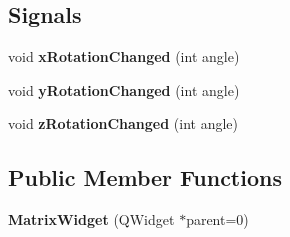 \subsection*{Signals}
\begin{DoxyCompactItemize}
\item 
\hypertarget{class_matrix_widget_a8ca3c8b5f4bee3639e3796888467bd4e}{void {\bfseries x\+Rotation\+Changed} (int angle)}\label{class_matrix_widget_a8ca3c8b5f4bee3639e3796888467bd4e}

\item 
\hypertarget{class_matrix_widget_a6ccdf79103c98aaebb433ea80640533b}{void {\bfseries y\+Rotation\+Changed} (int angle)}\label{class_matrix_widget_a6ccdf79103c98aaebb433ea80640533b}

\item 
\hypertarget{class_matrix_widget_a10801025feb3fa29eed36d30c0de1d6e}{void {\bfseries z\+Rotation\+Changed} (int angle)}\label{class_matrix_widget_a10801025feb3fa29eed36d30c0de1d6e}

\end{DoxyCompactItemize}
\subsection*{Public Member Functions}
\begin{DoxyCompactItemize}
\item 
\hypertarget{class_matrix_widget_a9ff859d14c9b69480e4d57ebd51905e8}{{\bfseries Matrix\+Widget} (Q\+Widget $\ast$parent=0)}\label{class_matrix_widget_a9ff859d14c9b69480e4d57ebd51905e8}

\end{DoxyCompactItemize}
